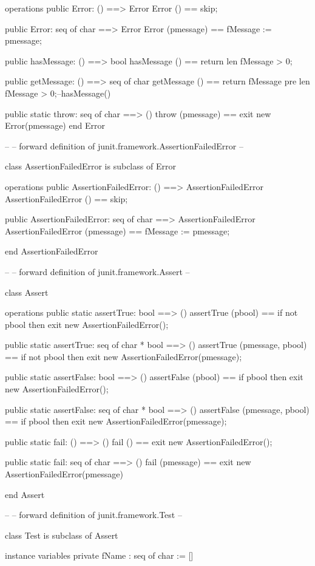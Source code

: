 \documentclass[a4paper]{article}
\begin{document}
\begin{vdm_al}
operations
  public Error: () ==> Error
  Error () == skip;
  
  public Error: seq of char ==> Error
  Error (pmessage) == fMessage := pmessage;

  public hasMessage: () ==> bool
  hasMessage () == return len fMessage > 0;
    
  public getMessage: () ==> seq of char
  getMessage () == return fMessage
    pre len fMessage > 0;--hasMessage()


  public static throw: seq of char ==> ()
  throw (pmessage) == exit new Error(pmessage)
end Error

--
-- forward definition of junit.framework.AssertionFailedError
--

class AssertionFailedError is subclass of Error

operations
  public AssertionFailedError: () ==> AssertionFailedError
  AssertionFailedError () == skip;
  
  public AssertionFailedError: seq of char ==> AssertionFailedError
  AssertionFailedError (pmessage) == fMessage := pmessage;
   
end AssertionFailedError

--
-- forward definition of junit.framework.Assert
--

class Assert

operations
  public static assertTrue: bool ==> ()
  assertTrue (pbool) ==
    if not pbool then exit new AssertionFailedError();
  
  public static assertTrue: seq of char * bool ==> ()
  assertTrue (pmessage, pbool) ==
    if not pbool then exit new AssertionFailedError(pmessage);
    
  public static assertFalse: bool ==> ()
  assertFalse (pbool) ==
    if pbool then exit new AssertionFailedError();
  
  public static assertFalse: seq of char * bool ==> ()
  assertFalse (pmessage, pbool) ==
    if pbool then exit new AssertionFailedError(pmessage);
    
  public static fail: () ==> ()
  fail () == exit new AssertionFailedError();
  
  public static fail: seq of char ==> ()
  fail (pmessage) == exit new AssertionFailedError(pmessage)
    
end Assert

--
-- forward definition of junit.framework.Test
--

class Test is subclass of Assert

instance variables
  private fName : seq of char := []
  

\end{vdm_al}
\end{document}
